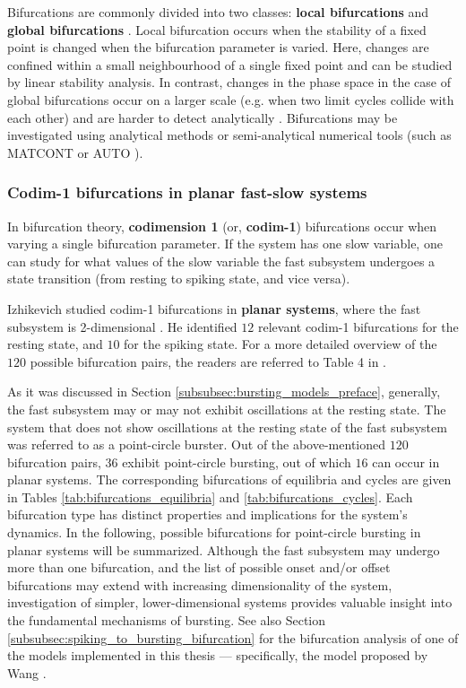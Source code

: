 \documentclass[../main.tex]{subfiles}
\begin{document}
Bifurcations are commonly divided into two classes: \textbf{local bifurcations} and \textbf{global bifurcations} \parencite{zhouBifurcation2013}. Local bifurcation occurs when the stability of a fixed point is changed when the bifurcation parameter is varied. Here, changes are confined within a small neighbourhood of a single fixed point and can be studied by linear stability analysis. In contrast, changes in the phase space in the case of global bifurcations occur on a larger scale (e.g. when two limit cycles collide with each other) and are harder to detect analytically \parencite{strogatzNonlinearDynamicsChaos2018}.
Bifurcations may be investigated using analytical methods or semi-analytical numerical tools (such as MATCONT \parencite{dhoogeMATCONTMATLABPackage2003} or AUTO \parencite{article}).

\subsubsection{Codim-1 bifurcations in planar fast-slow systems}

In bifurcation theory, \textbf{codimension 1} (or, \textbf{codim-1}) bifurcations occur when varying a single bifurcation parameter. If the system has one slow variable, one can study for what values of the slow variable the fast subsystem undergoes a state transition (from resting to spiking state, and vice versa).

Izhikevich studied codim-1 bifurcations in \textbf{planar systems}, where the fast subsystem is 2-dimensional \parencite{izhikevichNEURALEXCITABILITYSPIKING2000}. He identified $12$ relevant codim-1 bifurcations for the resting state, and $10$ for the spiking state. For a more detailed overview of the $120$ possible bifurcation pairs, the readers are referred to Table 4 in \parencite{izhikevichNEURALEXCITABILITYSPIKING2000}.

As it was discussed in Section \ref{subsubsec:bursting_models_preface}, generally, the fast subsystem may or may not exhibit oscillations at the resting state. The system that does not show oscillations at the resting state of the fast subsystem was referred to as a point-circle burster. Out of the above-mentioned $120$ bifurcation pairs, $36$ exhibit point-circle bursting, out of which $16$ can occur in planar systems.
The corresponding bifurcations of equilibria and cycles are given in Tables \ref{tab:bifurcations_equilibria} and \ref{tab:bifurcations_cycles}. Each bifurcation type has distinct properties and implications for the system's dynamics. 
In the following, possible bifurcations for point-circle bursting in planar systems will be summarized. Although the fast subsystem may undergo more than one bifurcation, and the list of possible onset and/or offset bifurcations may extend with increasing dimensionality of the system,
investigation of simpler, lower-dimensional systems provides valuable insight into the fundamental mechanisms of bursting. See also Section \ref{subsubsec:spiking_to_bursting_bifurcation} for the bifurcation analysis of one of the models implemented in this thesis — specifically, the model proposed by Wang \parencite{wangMultipleDynamicalModes1994}.
\end{document}
